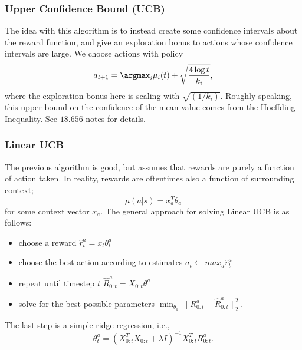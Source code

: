 \subsubsection{Upper Confidence Bound (UCB)}

The idea with this algorithm is to instead create some confidence intervals about the reward function, and give an exploration bonus to actions whose confidence intervals are large. We choose actions with policy
\[a_{t+1} = \argmax_i \mu_i(t) + \sqrt{\frac{4\log t}{k_i}},\] 
where the exploration bonus here is scaling with $\sqrt{(1/k_i)}$. Roughly speaking, this upper bound on the confidence of the mean value comes from the \ac{Hoeffding Inequality}. See $18.656$ notes for details.

\subsubsection{Linear UCB}

The previous algorithm is good, but assumes that rewards are purely a function of action taken. In reality, rewards are oftentimes also a function of surrounding context; 
\[\mu(a|s) = x_a^T\theta_a\]
for some context vector $x_a$. The general approach for solving Linear UCB is as follows: 
\begin{itemize}
	\item choose a reward $\hat{r}_t^a = x_t\theta_t^a$
	\item choose the best action according to estimates $a_t\leftarrow max_a \hat{r}_t^a$
	\item repeat until timestep $t$ $\hat{R}_{0:t}^a = X_{0:t}\theta^a$
	\item solve for the best possible parameters $\min_{\theta_a}\lVert R_{0:t}^a - \hat{R}_{0:t}^a\rVert_2^2$.
\end{itemize}
The last step is a simple ridge regression, i.e., 
\[\theta_t^a = (X_{0:t}^TX_{0:t}+\lambda I)^{-1}X_{0:t}^TR_{0:t}^a.\] 


